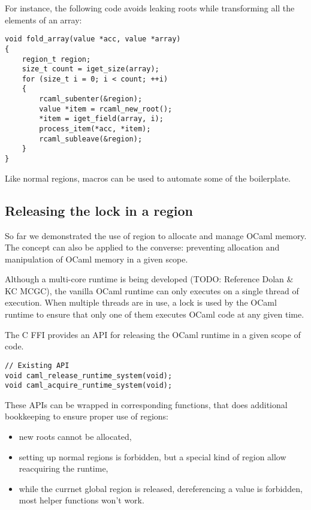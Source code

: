 \documentclass[a4paper]{easychair}
\newcommand{\cpp}[1]{\smash{\lstinline[style=C++]{#1}}}
\begin{document}
For instance, the following code avoids leaking roots while transforming
all the elements of an array:

\begin{lstlisting}[style=C++]
void fold_array(value *acc, value *array)
{
    region_t region;
    size_t count = iget_size(array);
    for (size_t i = 0; i < count; ++i)
    {
        rcaml_subenter(&region);
        value *item = rcaml_new_root();
        *item = iget_field(array, i);
        process_item(*acc, *item);
        rcaml_subleave(&region);
    }
}
\end{lstlisting}

Like normal regions, macros can be used to automate some of the
boilerplate.

\subsection{Releasing the lock in a region}

So far we demonstrated the use of region to allocate and manage OCaml
memory. The concept can also be applied to the converse: preventing
allocation and manipulation of OCaml memory in a given scope.

Although a multi-core runtime is being developed (TODO: Reference Dolan
\& KC MCGC), the vanilla OCaml runtime can only executes on a single
thread of execution. When multiple threads are in use, a lock is used by
the OCaml runtime to ensure that only one of them executes OCaml code at
any given time.

The C FFI provides an API for releasing the OCaml runtime in a given
scope of code.

\begin{lstlisting}[style=C++]
// Existing API
void caml_release_runtime_system(void);
void caml_acquire_runtime_system(void);
\end{lstlisting}

These APIs can be wrapped in corresponding
\cpp{rcaml\_\{acquire,release\}\_runtime\_system} functions, that
does additional bookkeeping to ensure proper use of regions:

\begin{itemize}
\item new roots cannot be allocated,
\item setting up normal regions is forbidden, but a special kind of region
      allow reacquiring the runtime,
\item while the currnet global region is released, dereferencing a value is
      forbidden, most helper functions won't work.
\end{itemize}
\end{document}
